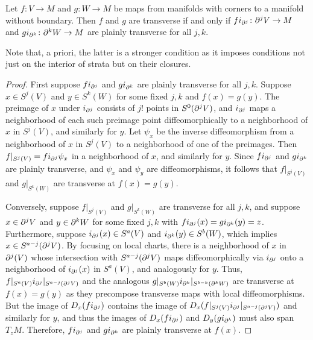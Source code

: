\begin{lemma}\label{L: simple trans}
	Let $f \colon V \to M$ and $g \colon W \to M$ be maps from manifolds with corners to a manifold without boundary.
	Then $f$ and $g$ are transverse if and only if $fi_{\partial^j} \colon \partial^jV \to M$ and $gi_{\partial^k} \colon \partial^kW \to M$ are plainly transverse for all $j,k$.
\end{lemma}

Note that, a priori, the latter is a stronger condition as it imposes conditions not just on the interior of strata but on their closures.

\begin{proof}
	First suppose $fi_{\partial^j}$ and $gi_{\partial^k}$ are plainly transverse for all $j,k$.
	Suppose $x \in S^j(V)$ and $y \in S^k(W)$ for some fixed $j,k$ and $f(x) = g(y)$.
	The preimage of $x$ under $i_{\partial^j}$ consists of $j!$ points in $S^0(\partial^jV)$, and $i_{\partial^j}$ maps a neighborhood of each such preimage point diffeomorphically to a neighborhood of $x$ in $S^j(V)$, and similarly for $y$.
	Let $\psi_x$ be the inverse diffeomorphism from a neighborhood of $x$ in $S^j(V)$ to a neighborhood of one of the preimages.
	Then $f|_{S^j(V)} = fi_{\partial^j}\psi_x$ in a neighborhood of $x$, and similarly for $y$.
	Since $fi_{\partial^j}$ and $gi_{\partial^k}$ are plainly transverse, and $\psi_x$ and $\psi_y$ are diffeomorphisms, it follows that $f|_{S^j(V)}$ and $g|_{S^k(W)}$ are transverse at $f(x) = g(y)$.

	Conversely, suppose $f|_{S^j(V)}$ and $g|_{S^k(W)}$ are transverse for all $j,k$, and suppose $x \in \partial^jV$ and $y \in \partial^kW$ for some fixed $j,k$ with $fi_{\partial^j}(x) = gi_{\partial^k}(y) = z$.
	Furthermore, suppose $i_{\partial^j}(x) \in S^a(V)$ and $i_{\partial^k}(y) \in S^b(W)$, which implies $x \in S^{a-j}(\partial^j V)$.
	By focusing on local charts, there is a neighborhood of $x$ in $\partial^j(V)$ whose intersection with $S^{a-j}(\partial^j V)$ maps diffeomorphically via $i_{\partial^j}$ onto a neighborhood of $i_{\partial^j}(x)$ in $S^a(V)$, and analogously for $y$.
	Thus, $f|_{S^a(V)}i_{\partial^j}|_{S^{a-j}(\partial^j V)}$ and the analogous $g|_{S^b(W)}i_{\partial^k}|_{S^{b-k}(\partial^k W)}$ are transverse at $f(x) = g(y)$ as they precompose transverse maps with local diffeomorphisms.
	But the image of $D_x(fi_{\partial^j})$ contains the image of $D_x(f|_{S^j(V)}i_{\partial^j}|_{S^{a-j}(\partial^j V)})$ and similarly for $y$, and thus the images of $D_x(fi_{\partial^j})$ and $D_y(gi_{\partial^k})$ must also span $T_{z}M$.
	Therefore, $fi_{\partial^j}$ and $gi_{\partial^k}$ are plainly transverse at $f(x)$.
\end{proof}

